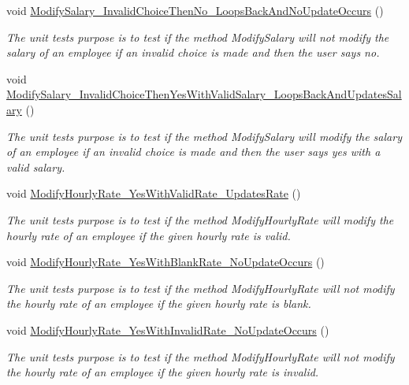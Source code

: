\begin{DoxyCompactItemize}
void \hyperlink{class_the_company_1_1_tests_1_1_modify_employee_tests_a7aa63e1675a12d33de560ee1e6568253}{Modify\+Salary\+\_\+\+Invalid\+Choice\+Then\+No\+\_\+\+Loops\+Back\+And\+No\+Update\+Occurs} ()
\begin{DoxyCompactList}\small\item\em The unit test\textquotesingle{}s purpose is to test if the method Modify\+Salary will not modify the salary of an employee if an invalid choice is made and then the user says no. \end{DoxyCompactList}\item 
void \hyperlink{class_the_company_1_1_tests_1_1_modify_employee_tests_a082f8adffb6b2858aefbd4b9443ecb4b}{Modify\+Salary\+\_\+\+Invalid\+Choice\+Then\+Yes\+With\+Valid\+Salary\+\_\+\+Loops\+Back\+And\+Updates\+Salary} ()
\begin{DoxyCompactList}\small\item\em The unit test\textquotesingle{}s purpose is to test if the method Modify\+Salary will modify the salary of an employee if an invalid choice is made and then the user says yes with a valid salary. \end{DoxyCompactList}\item 
void \hyperlink{class_the_company_1_1_tests_1_1_modify_employee_tests_abb295ffadad6ffc7c79e326173029760}{Modify\+Hourly\+Rate\+\_\+\+Yes\+With\+Valid\+Rate\+\_\+\+Updates\+Rate} ()
\begin{DoxyCompactList}\small\item\em The unit test\textquotesingle{}s purpose is to test if the method Modify\+Hourly\+Rate will modify the hourly rate of an employee if the given hourly rate is valid. \end{DoxyCompactList}\item 
void \hyperlink{class_the_company_1_1_tests_1_1_modify_employee_tests_a975702204fb199aa4002c10632bd936e}{Modify\+Hourly\+Rate\+\_\+\+Yes\+With\+Blank\+Rate\+\_\+\+No\+Update\+Occurs} ()
\begin{DoxyCompactList}\small\item\em The unit test\textquotesingle{}s purpose is to test if the method Modify\+Hourly\+Rate will not modify the hourly rate of an employee if the given hourly rate is blank. \end{DoxyCompactList}\item 
void \hyperlink{class_the_company_1_1_tests_1_1_modify_employee_tests_a05de446ecc3856d622f425aae896d0f2}{Modify\+Hourly\+Rate\+\_\+\+Yes\+With\+Invalid\+Rate\+\_\+\+No\+Update\+Occurs} ()
\begin{DoxyCompactList}\small\item\em The unit test\textquotesingle{}s purpose is to test if the method Modify\+Hourly\+Rate will not modify the hourly rate of an employee if the given hourly rate is invalid. \end{DoxyCompactList}\item 

\end{DoxyCompactItemize}
